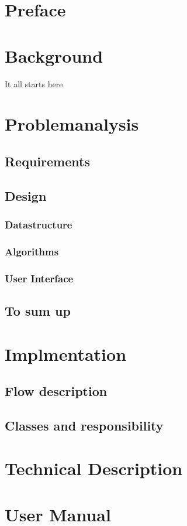\documentclass[a4paper,10pt,titlepage]{article}
\begin{document}
	
	\tableofcontents
	\newpage
	\section{Preface}
	\section{Background}
		It all starts here
	\section{Problemanalysis}
		\subsection{Requirements}
		
		\subsection{Design}
			
			\subsubsection{Datastructure}
				
			\subsubsection{Algorithms}
				
			\subsubsection{User Interface}
				
		\subsection{To sum up}
			
	\section{Implmentation}
		\subsection{Flow description}
		\subsection{Classes and responsibility}
		
	\section{Technical Description}
	
	\section{User Manual}
		
				
		
	\section{}
\end{document}
